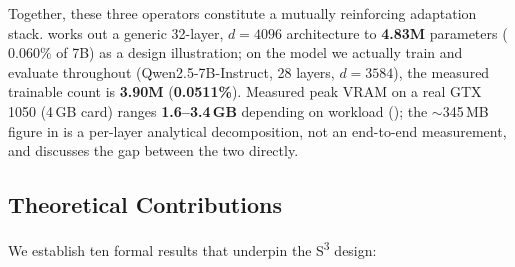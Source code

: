 \documentclass[conference]{IEEEtran}
\newcommand{\sthree}{S\textsuperscript{3}}
\begin{document}
Together, these three operators constitute a mutually reinforcing adaptation stack.  works out a generic 32-layer, $d{=}4096$ architecture to \textbf{4.83M} parameters ($0.060\%$ of 7B) as a design illustration; on the model we actually train and evaluate throughout  (Qwen2.5-7B-Instruct, 28 layers, $d{=}3584$), the measured trainable count is \textbf{3.90M} (\textbf{0.0511\%}). Measured peak VRAM on a real GTX 1050 (4\,GB card) ranges \textbf{1.6--3.4\,GB} depending on workload (); the $\sim$345\,MB figure in  is a per-layer analytical decomposition, not an end-to-end measurement, and  discusses the gap between the two directly.

\subsection{Theoretical Contributions}

We establish ten formal results that underpin the \sthree{} design:
\end{document}
